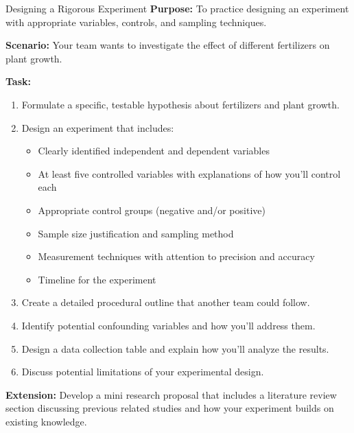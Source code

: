 
\begin{investigation}{Designing a Rigorous Experiment}
\textbf{Purpose:} To practice designing an experiment with appropriate variables, controls, and sampling techniques.

\textbf{Scenario:} Your team wants to investigate the effect of different fertilizers on plant growth.

\textbf{Task:}
\begin{enumerate}
    \item Formulate a specific, testable hypothesis about fertilizers and plant growth.
    
    \item Design an experiment that includes:
    \begin{itemize}
        \item Clearly identified independent and dependent variables
        \item At least five controlled variables with explanations of how you'll control each
        \item Appropriate control groups (negative and/or positive)
        \item Sample size justification and sampling method
        \item Measurement techniques with attention to precision and accuracy
        \item Timeline for the experiment
    \end{itemize}
    
    \item Create a detailed procedural outline that another team could follow.
    
    \item Identify potential confounding variables and how you'll address them.
    
    \item Design a data collection table and explain how you'll analyze the results.
    
    \item Discuss potential limitations of your experimental design.
\end{enumerate}

\textbf{Extension:} Develop a mini research proposal that includes a literature review section discussing previous related studies and how your experiment builds on existing knowledge.
\end{investigation}

